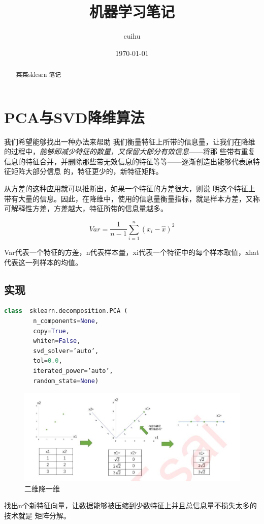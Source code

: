 \documentclass{article}
\title{机器学习笔记}
\author{cuihu}
\date{\today}
\begin{document}
	\maketitle
	\begin{abstract}
		菜菜sklearn 笔记	
	\end{abstract}

\section{PCA与SVD降维算法}
		我们希望能够找出一种办法来帮助
		我们衡量特征上所带的信息量，让我们在降维的过程中，\emph{能够即减少特征的数量，又保留大部分有效信息}——将那
		些带有重复信息的特征合并，并删除那些带无效信息的特征等等——逐渐创造出能够代表原特征矩阵大部分信息
		的，特征更少的，新特征矩阵。
		
		
	   从方差的这种应用就可以推断出，如果一个特征的方差很大，则说
	   明这个特征上带有大量的信息。因此，在降维中，{\heiti 使用的信息量衡量指标，就是样本方差，又称可解释性方差，方差越大，特征所带的信息量越多。}
	 
		$$V a r=\frac{1}{n-1} \sum_{i=1}^{n}\left(x_{i}-\hat{x}\right)^{2}$$
		
		Var代表一个特征的方差，n代表样本量，xi代表一个特征中的每个样本取值，xhat代表这一列样本的均值。
	
	\subsection{实现}
	
	\begin{lstlisting}[language=python]
		class  sklearn.decomposition.PCA (
		n_components=None, 
		copy=True, 
		whiten=False, 
		svd_solver=’auto’, 
		tol=0.0,
		iterated_power=’auto’, 
		random_state=None)
	\end{lstlisting}
	
	\begin{figure}[htpb]
		\centering
		\includegraphics[width=\linewidth]{skl_fig/sk1}
		\caption{二维降一维}
	\end{figure}
	{\heiti 找出n个新特征向量，让数据能够被压缩到少数特征上并且总信息量不损失太多的技术就是
	矩阵分解。}
	
\end{document}
